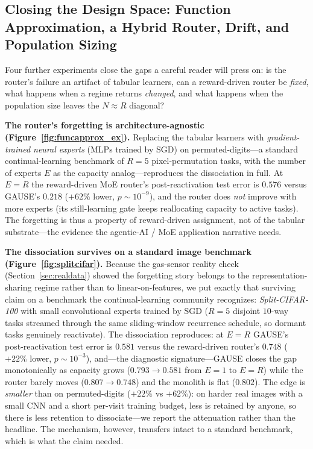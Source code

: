 \documentclass[10pt]{article}
\begin{document}
\subsection{Closing the Design Space: Function Approximation, a Hybrid Router,
Drift, and Population Sizing}
\label{sec:closing}

Four further experiments close the gaps a careful reader will press on: is the
router's failure an artifact of tabular learners, can a reward-driven router be
\emph{fixed}, what happens when a regime returns \emph{changed}, and what happens
when the population size leaves the $N\approx R$ diagonal?

\textbf{The router's forgetting is architecture-agnostic
(Figure~\ref{fig:funcapprox_ex}).} Replacing the tabular learners with
\emph{gradient-trained neural experts} (MLPs trained by SGD) on permuted-digits---a
standard continual-learning benchmark of $R{=}5$ pixel-permutation tasks, with the
number of experts $E$ as the capacity analog---reproduces the dissociation in full. At
$E{=}R$ the reward-driven MoE router's post-reactivation test error is $0.576$ versus
GAUSE's $0.218$ ($+62\%$ lower, $p\sim10^{-9}$), and the router does \emph{not} improve
with more experts (its still-learning gate keeps reallocating capacity to active tasks).
The forgetting is thus a property of reward-driven assignment, not of the tabular
substrate---the evidence the agentic-AI / MoE application narrative needs.

\textbf{The dissociation survives on a standard image benchmark
(Figure~\ref{fig:splitcifar}).} Because the gas-sensor reality check
(Section~\ref{sec:realdata}) showed the forgetting story belongs to the
representation-sharing regime rather than to linear-on-features, we put exactly that
surviving claim on a benchmark the continual-learning community recognizes:
\emph{Split-CIFAR-100} with small convolutional experts trained by SGD ($R{=}5$ disjoint
$10$-way tasks streamed through the same sliding-window recurrence schedule, so dormant
tasks genuinely reactivate). The dissociation reproduces: at $E{=}R$ GAUSE's
post-reactivation test error is $0.581$ versus the reward-driven router's $0.748$
($+22\%$ lower, $p\sim10^{-3}$), and---the diagnostic signature---GAUSE closes the gap
monotonically as capacity grows ($0.793\!\to\!0.581$ from $E{=}1$ to $E{=}R$) while the
router barely moves ($0.807\!\to\!0.748$) and the monolith is flat ($0.802$). The edge
is \emph{smaller} than on permuted-digits ($+22\%$ vs $+62\%$): on harder real images
with a small CNN and a short per-visit training budget, less is retained by anyone, so
there is less retention to dissociate---we report the attenuation rather than the
headline. The mechanism, however, transfers intact to a standard benchmark, which is
what the claim needed.
\end{document}

